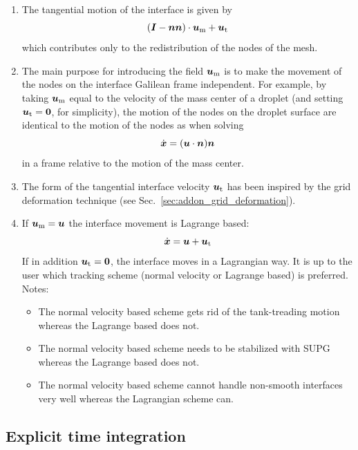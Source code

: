 \begin{enumerate}
   \item The tangential motion of the interface is given by
\[
     ( \boldsymbol{I} - \boldsymbol{n}\boldsymbol{n} ) \cdot \boldsymbol{u}_\text{m}  +\boldsymbol{u}_\text{t}
\]
which contributes only to the redistribution of the nodes of the mesh.
   \item The main purpose for introducing the field $\boldsymbol{u}_\text{m}$ is to
make the movement of the nodes on the interface Galilean frame independent. For
example, by taking $\boldsymbol{u}_\text{m}$ equal to the velocity of the
mass center of a droplet (and setting $\boldsymbol{u}_\text{t}=\boldsymbol{0}$, for simplicity),
the motion of the nodes on the droplet surface are
identical to the motion of the nodes as when solving 
\begin{equation}
   \dot{\boldsymbol{x}}=(\boldsymbol{u}\cdot\boldsymbol{n})\boldsymbol{n}
\end{equation}
in a frame relative to the motion of the mass center.
\item The form of the tangential interface velocity $\boldsymbol{u}_\text{t}$ has been
inspired by the grid deformation technique  (see
Sec.~\ref{sec:addon_grid_deformation}).
   \item If $\boldsymbol{u}_\text{m}=\boldsymbol{u}$
the interface movement is Lagrange based:
\begin{equation}
   \dot{\boldsymbol{x}} = \boldsymbol{u} + \boldsymbol{u}_\text{t}
  \label{eq:xdot_lagr}
\end{equation}
If in addition $\boldsymbol{u}_\text{t}=\boldsymbol{0}$,
 the interface moves in a Lagrangian way.
It is up to the user which tracking scheme (normal velocity or 
Lagrange based) is preferred. Notes:
\begin{itemize}
   \item The normal velocity based scheme gets rid of the tank-treading motion
     whereas the Lagrange based does not.
   \item The normal velocity based scheme needs to be stabilized with SUPG
     whereas the Lagrange based does not.
   \item The normal velocity based scheme cannot handle non-smooth interfaces
         very well whereas the Lagrangian scheme can.
\end{itemize}
\end{enumerate}

\subsection{Explicit time integration}
\label{sec:interface_tracking_explicit}

